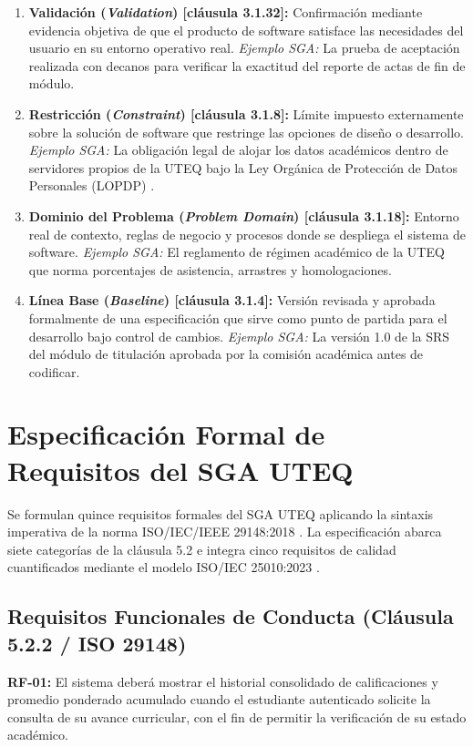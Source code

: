 \documentclass[conference]{IEEEtran}
\newcommand{\req}[1]{\noindent\textbf{#1:}\enspace}
\begin{document}
\begin{enumerate}
		\item \textbf{Validación (\emph{Validation}) [cláusula 3.1.32]:} Confirmación mediante evidencia objetiva de que el producto de software satisface las necesidades del usuario en su entorno operativo real.  
		\emph{Ejemplo SGA:} La prueba de aceptación realizada con decanos para verificar la exactitud del reporte de actas de fin de módulo.
		
		\item \textbf{Restricción (\emph{Constraint}) [cláusula 3.1.8]:} Límite impuesto externamente sobre la solución de software que restringe las opciones de diseño o desarrollo.  
		\emph{Ejemplo SGA:} La obligación legal de alojar los datos académicos dentro de servidores propios de la UTEQ bajo la Ley Orgánica de Protección de Datos Personales (LOPDP) \cite{lopdp2021}.
		
		\item \textbf{Dominio del Problema (\emph{Problem Domain}) [cláusula 3.1.18]:} Entorno real de contexto, reglas de negocio y procesos donde se despliega el sistema de software.  
		\emph{Ejemplo SGA:} El reglamento de régimen académico de la UTEQ que norma porcentajes de asistencia, arrastres y homologaciones.
		
		\item \textbf{Línea Base (\emph{Baseline}) [cláusula 3.1.4]:} Versión revisada y aprobada formalmente de una especificación que sirve como punto de partida para el desarrollo bajo control de cambios.  
		\emph{Ejemplo SGA:} La versión 1.0 de la SRS del módulo de titulación aprobada por la comisión académica antes de codificar.
	\end{enumerate}
	
	\section{Especificación Formal de Requisitos del SGA UTEQ}
	Se formulan quince requisitos formales del SGA UTEQ aplicando la sintaxis imperativa de la norma ISO/IEC/IEEE 29148:2018 \cite{ieee29148}. La especificación abarca siete categorías de la cláusula 5.2 e integra cinco requisitos de calidad cuantificados mediante el modelo ISO/IEC 25010:2023 \cite{iso25010}.
	
	\subsection{Requisitos Funcionales de Conducta (Cláusula 5.2.2 / ISO 29148)}
	\req{RF-01} El sistema deberá mostrar el historial consolidado de calificaciones y promedio ponderado acumulado cuando el estudiante autenticado solicite la consulta de su avance curricular, con el fin de permitir la verificación de su estado académico.
	
\end{document}
